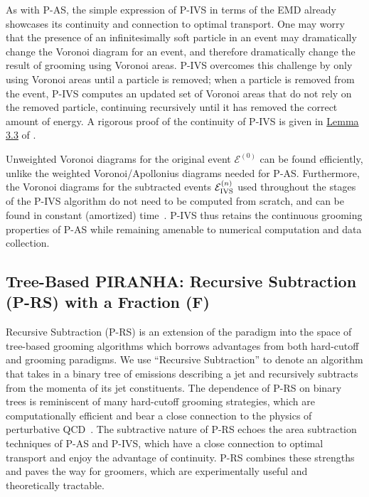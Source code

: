 \documentclass[letterpaper,11pt]{article}
\begin{document}
As with P-AS, the simple expression of P-IVS in terms of the EMD already showcases its continuity and connection to optimal transport.
%
One may worry that the presence of an infinitesimally soft particle in an event may dramatically change the Voronoi diagram for an event, and therefore dramatically change the result of grooming using Voronoi areas.
%
P-IVS overcomes this challenge by only using Voronoi areas until a particle is removed;
%
when a particle is removed from the event, P-IVS computes an updated set of Voronoi areas that do not rely on the removed particle, continuing recursively until it has removed the correct amount of energy.
%
A rigorous proof of the continuity of P-IVS is given in \href{https://arxiv.org/pdf/1706.07403.pdf#page=15&zoom=100,0,200}{Lemma 3.3} of .

Unweighted Voronoi diagrams for the original event \(\mathcal{E}^{(0)}\) can be found efficiently, unlike the weighted Voronoi/Apollonius diagrams needed for P-AS.
%
Furthermore, the Voronoi diagrams for the subtracted events \(\mathcal{E}^{(n)}_{\rm IVS}\) used throughout the stages of the P-IVS algorithm do not need to be computed from scratch, and can be found in constant (amortized) time~\cite{Komiske:2020qhg}.
%
P-IVS thus retains the continuous grooming properties of P-AS while remaining amenable to numerical computation and data collection.


\subsection{Tree-Based PIRANHA{}: Recursive Subtraction (P-RS) with a Fraction (F)}
\label{sec:rsf}

Recursive Subtraction (P-RS) is an extension of the \PIRANHA{} paradigm into the space of tree-based grooming algorithms which borrows advantages from both hard-cutoff and \PIRANHA{} grooming paradigms.
%
We use ``Recursive Subtraction'' to denote an algorithm that takes in a binary tree of emissions describing a jet and recursively subtracts from the momenta of its jet constituents.
%
The dependence of P-RS on binary trees is reminiscent of many hard-cutoff grooming strategies, which are computationally efficient and bear a close connection to the physics of perturbative QCD~\cite{Larkoski:2014wba,Collins:2011zzd}.
%
The subtractive nature of P-RS echoes the area subtraction techniques of P-AS and P-IVS, which have a close connection to optimal transport and enjoy the advantage of continuity.
%
P-RS combines these strengths and paves the way for \PIRANHA{} groomers, which are experimentally useful and theoretically tractable.
\end{document}
